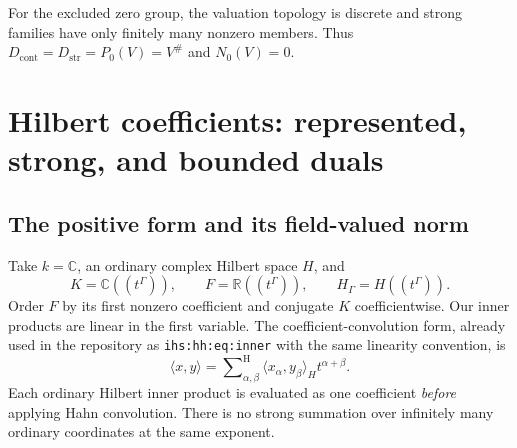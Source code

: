 \documentclass[11pt,letterpaper]{article}
\numberwithin{equation}{section}
\theoremstyle{definition}
\theoremstyle{remark}
\newcommand{\C}{\mathbb C}
\newcommand{\R}{\mathbb R}
\newcommand{\HG}{H_\Gamma}
\newcommand{\Dstr}{D_{\mathrm{str}}}
\newcommand{\Dcont}{D_{\mathrm{cont}}}
\newcommand{\sH}{\mathop{\sum}\nolimits^{\mathrm H}}
\newcommand{\ip}[2]{\langle#1,#2\rangle}
\newcommand{\ihs}[1]{\texttt{ihs:#1}}
\begin{document}
For the excluded zero group, the valuation topology is discrete and
strong families have only finitely many nonzero members. Thus
$\Dcont=\Dstr=P_0(V)=V^\#$ and $N_0(V)=0$.

\section{Hilbert coefficients: represented, strong, and bounded duals}
\label{duals:sec:hilbert}

\subsection{The positive form and its field-valued norm}
Take $k=\C$, an ordinary complex Hilbert space $H$, and
\[
 K=\C((t^\Gamma)),\qquad F=\R((t^\Gamma)),\qquad
 \HG=H((t^\Gamma)).
\]
Order $F$ by its first nonzero coefficient and conjugate $K$
coefficientwise. Our inner products are linear in the first variable.
The coefficient-convolution form, already used in the repository
\cite{RepoSpectral} as \ihs{hh:eq:inner} with the same linearity
convention, is
\begin{equation}\label{duals:eq:inner}
 \ip{x}{y}=\sH_{\alpha,\beta}
       \ip{x_\alpha}{y_\beta}_H t^{\alpha+\beta}.
\end{equation}
Each ordinary Hilbert inner product is evaluated as one coefficient
\emph{before} applying Hahn convolution. There is no strong summation
over infinitely many ordinary coordinates at the same exponent.
\end{document}
